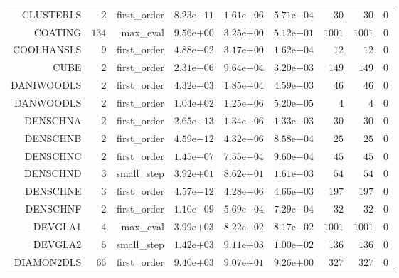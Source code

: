 \begin{longtable}{rrrrrrrrr}
CLUSTERLS & \(     2\) & first\_order & \( 8.23\)e\(-11\) & \( 1.61\)e\(-06\) & \( 5.71\)e\(-04\) & \(    30\) & \(    30\) & \(     0\) \\
COATING & \(   134\) & max\_eval & \( 9.56\)e\(+00\) & \( 3.25\)e\(+00\) & \( 5.12\)e\(-01\) & \(  1001\) & \(  1001\) & \(     0\) \\
COOLHANSLS & \(     9\) & first\_order & \( 4.88\)e\(-02\) & \( 3.17\)e\(+00\) & \( 1.62\)e\(-04\) & \(    12\) & \(    12\) & \(     0\) \\
CUBE & \(     2\) & first\_order & \( 2.31\)e\(-06\) & \( 9.64\)e\(-04\) & \( 3.20\)e\(-03\) & \(   149\) & \(   149\) & \(     0\) \\
DANIWOODLS & \(     2\) & first\_order & \( 4.32\)e\(-03\) & \( 1.85\)e\(-04\) & \( 4.59\)e\(-03\) & \(    46\) & \(    46\) & \(     0\) \\
DANWOODLS & \(     2\) & first\_order & \( 1.04\)e\(+02\) & \( 1.25\)e\(-06\) & \( 5.20\)e\(-05\) & \(     4\) & \(     4\) & \(     0\) \\
DENSCHNA & \(     2\) & first\_order & \( 2.65\)e\(-13\) & \( 1.34\)e\(-06\) & \( 1.33\)e\(-03\) & \(    30\) & \(    30\) & \(     0\) \\
DENSCHNB & \(     2\) & first\_order & \( 4.59\)e\(-12\) & \( 4.32\)e\(-06\) & \( 8.58\)e\(-04\) & \(    25\) & \(    25\) & \(     0\) \\
DENSCHNC & \(     2\) & first\_order & \( 1.45\)e\(-07\) & \( 7.55\)e\(-04\) & \( 9.60\)e\(-04\) & \(    45\) & \(    45\) & \(     0\) \\
DENSCHND & \(     3\) & small\_step & \( 3.92\)e\(+01\) & \( 8.62\)e\(+01\) & \( 1.61\)e\(-03\) & \(    54\) & \(    54\) & \(     0\) \\
DENSCHNE & \(     3\) & first\_order & \( 4.57\)e\(-12\) & \( 4.28\)e\(-06\) & \( 4.66\)e\(-03\) & \(   197\) & \(   197\) & \(     0\) \\
DENSCHNF & \(     2\) & first\_order & \( 1.10\)e\(-09\) & \( 5.69\)e\(-04\) & \( 7.29\)e\(-04\) & \(    32\) & \(    32\) & \(     0\) \\
DEVGLA1 & \(     4\) & max\_eval & \( 3.99\)e\(+03\) & \( 8.22\)e\(+02\) & \( 8.17\)e\(-02\) & \(  1001\) & \(  1001\) & \(     0\) \\
DEVGLA2 & \(     5\) & small\_step & \( 1.42\)e\(+03\) & \( 9.11\)e\(+03\) & \( 1.00\)e\(-02\) & \(   136\) & \(   136\) & \(     0\) \\
DIAMON2DLS & \(    66\) & first\_order & \( 9.40\)e\(+03\) & \( 9.07\)e\(+01\) & \( 9.26\)e\(+00\) & \(   327\) & \(   327\) & \(     0\) \\

\end{longtable}
